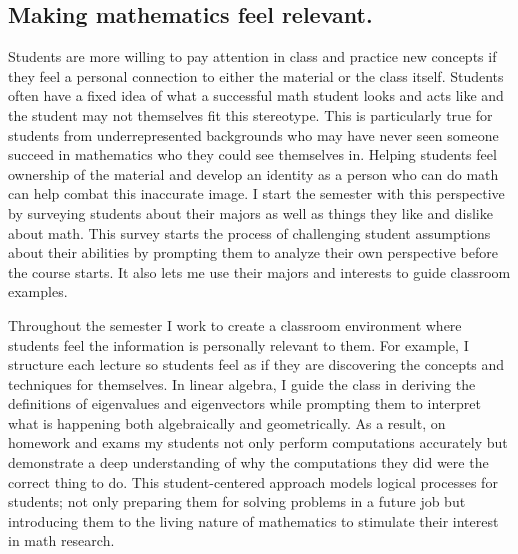 \documentclass[11pt]{amsart}
\theoremstyle{plain}
\theoremstyle{definition}
\theoremstyle{remark}
\begin{document}
\subsection*{Making mathematics feel relevant.}Students are more willing to pay attention in class and practice new concepts if they feel a personal connection to either the material or the class itself. Students often have a fixed idea of what a successful math student looks and acts like and the student may not themselves fit this stereotype. This is particularly true for students from underrepresented backgrounds who may have never seen someone succeed in mathematics who they could see themselves in. Helping students feel ownership of the material and develop an identity as a person who can do math can help combat this inaccurate image. I start the semester with this perspective by surveying students about their majors as well as things they like and dislike about math. This survey starts the process of challenging student assumptions about their abilities by prompting them to analyze their own perspective before the course starts. It also lets me use their majors and interests to guide classroom examples. 

Throughout the semester I work to create a classroom environment where students feel the information is personally relevant to them.  For example, I structure each lecture so students feel as if they are discovering the concepts and techniques for themselves. In linear algebra, I guide the class in deriving the definitions of eigenvalues and eigenvectors while prompting them to interpret what is happening both algebraically and geometrically. As a result, on homework and exams my students not only perform computations accurately but demonstrate a deep understanding of why the computations they did were the correct thing to do. This student-centered approach models logical processes for students; not only preparing them for solving problems in a future job but introducing them to the living nature of mathematics to stimulate their interest in math research.
\end{document}
